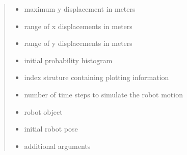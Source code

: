 \documentclass[letterpaper,10pt,english]{sphinxmanual}
\begin{document}
\begin{fulllineitems}
\begin{fulllineitems}
\begin{quote}
\begin{description}
\begin{itemize}
\item {} 
\sphinxAtStartPar
{} \textendash{} maximum y displacement in meters

\item {} 
\sphinxAtStartPar
{} \textendash{} range of x displacements in meters

\item {} 
\sphinxAtStartPar
{} \textendash{} range of y displacements in meters

\item {} 
\sphinxAtStartPar
{} \textendash{} initial probability histogram

\item {} 
\sphinxAtStartPar
{} \textendash{} index struture containing plotting information

\item {} 
\sphinxAtStartPar
{} \textendash{} number of time steps to simulate the robot motion

\item {} 
\sphinxAtStartPar
{} \textendash{} robot object

\item {} 
\sphinxAtStartPar
{} \textendash{} initial robot pose

\item {} 
\sphinxAtStartPar
{} \textendash{} additional arguments

\end{itemize}

\end{description}\end{quote}

\end{fulllineitems}



\end{fulllineitems}
\end{document}
